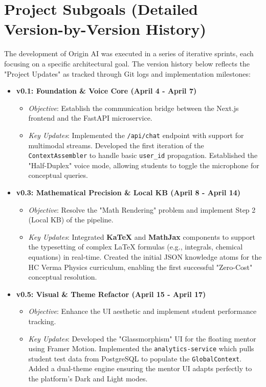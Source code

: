 \section{Project Subgoals (Detailed Version-by-Version History)}

The development of Origin AI was executed in a series of iterative sprints, each focusing on a specific architectural goal. The version history below reflects the "Project Updates" as tracked through Git logs and implementation milestones:

\begin{itemize}
    \item \textbf{v0.1: Foundation \& Voice Core (April 4 - April 7)}  
    \begin{itemize}
        \item \textit{Objective}: Establish the communication bridge between the Next.js frontend and the FastAPI microservice.
        \item \textit{Key Updates}: Implemented the \texttt{/api/chat} endpoint with support for multimodal streams. Developed the first iteration of the \texttt{ContextAssembler} to handle basic \texttt{user\_id} propagation. Established the "Half-Duplex" voice mode, allowing students to toggle the microphone for conceptual queries.
    \end{itemize}

    \item \textbf{v0.3: Mathematical Precision \& Local KB (April 8 - April 14)}  
    \begin{itemize}
        \item \textit{Objective}: Resolve the "Math Rendering" problem and implement Step 2 (Local KB) of the pipeline.
        \item \textit{Key Updates}: Integrated \textbf{KaTeX} and \textbf{MathJax} components to support the typesetting of complex LaTeX formulas (e.g., integrals, chemical equations) in real-time. Created the initial JSON knowledge atoms for the HC Verma Physics curriculum, enabling the first successful "Zero-Cost" conceptual resolution.
    \end{itemize}

    \item \textbf{v0.5: Visual & Theme Refactor (April 15 - April 17)}  
    \begin{itemize}
        \item \textit{Objective}: Enhance the UI aesthetic and implement student performance tracking.
        \item \textit{Key Updates}: Developed the "Glassmorphism" UI for the floating mentor using Framer Motion. Implemented the \texttt{analytics-service} which pulls student test data from PostgreSQL to populate the \texttt{GlobalContext}. Added a dual-theme engine ensuring the mentor UI adapts perfectly to the platform's Dark and Light modes.
    \end{itemize}


\end{itemize}
